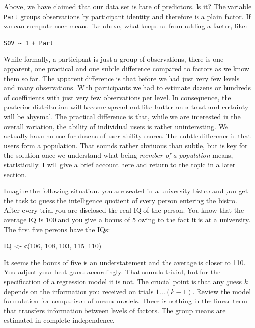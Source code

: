 \documentclass[]{svmono}
\newenvironment{Shaded}{\begin{snugshade}}{\end{snugshade}}
\newcommand{\KeywordTok}[1]{\textcolor[rgb]{0.13,0.29,0.53}{\textbf{#1}}}
\newcommand{\DecValTok}[1]{\textcolor[rgb]{0.00,0.00,0.81}{#1}}
\newcommand{\StringTok}[1]{\textcolor[rgb]{0.31,0.60,0.02}{#1}}
\newcommand{\NormalTok}[1]{#1}
\theoremstyle{definition}
\theoremstyle{definition}
\theoremstyle{definition}
\theoremstyle{remark}
\begin{document}
Above, we have claimed that our data set is bare of predictors. Is it?
The variable \texttt{Part} groups observations by participant identity
and therefore is a plain factor. If we can compute user means like
above, what keeps us from adding a factor, like:

\texttt{SOV\ \textasciitilde{}\ 1\ +\ Part}

While formally, a participant is just a group of observations, there is
one apparent, one practical and one subtle difference compared to
factors as we know them so far. The apparent difference is that before
we had just very few levels and many observations. With participants we
had to estimate dozens or hundreds of coefficients with just very few
observations per level. In consequence, the posterior distribution will
become spread out like butter on a toast and certainty will be abysmal.
The practical difference is that, while we are interested in the overall
variation, the ability of individual users is rather uninteresting. We
actually have no use for dozens of user ability scores. The subtle
difference is that users form a population. That sounds rather obviuous
than subtle, but is key for the solution once we understand what being
\emph{member of a population} means, statistically. I will give a brief
account here and return to the topic in a later section.

Imagine the following situation: you are seated in a university bistro
and you get the task to guess the intelligence quotient of every person
entering the bistro. After every trial you are disclosed the real IQ of
the person. You know that the average IQ is 100 and you give a bonus of
5 owing to the fact it is at a university. The first five persons have
the IQs:

\begin{Shaded}
\begin{Highlighting}[]
\NormalTok{IQ <-}\StringTok{ }\KeywordTok{c}\NormalTok{(}\DecValTok{106}\NormalTok{, }\DecValTok{108}\NormalTok{, }\DecValTok{103}\NormalTok{, }\DecValTok{115}\NormalTok{, }\DecValTok{110}\NormalTok{)}
\end{Highlighting}
\end{Shaded}

It seems the bonus of five is an understatement and the average is
closer to 110. You adjust your best guess accordingly. That sounds
trivial, but for the specification of a regression model it is not. The
crucial point is that any guess \(k\) depends on the information you
received on trials \(1...(k-1)\). Review the model formulation for
comparison of means models. There is nothing in the linear term that
transfers information between levels of factors. The group means are
estimated in complete independence.
\end{document}
